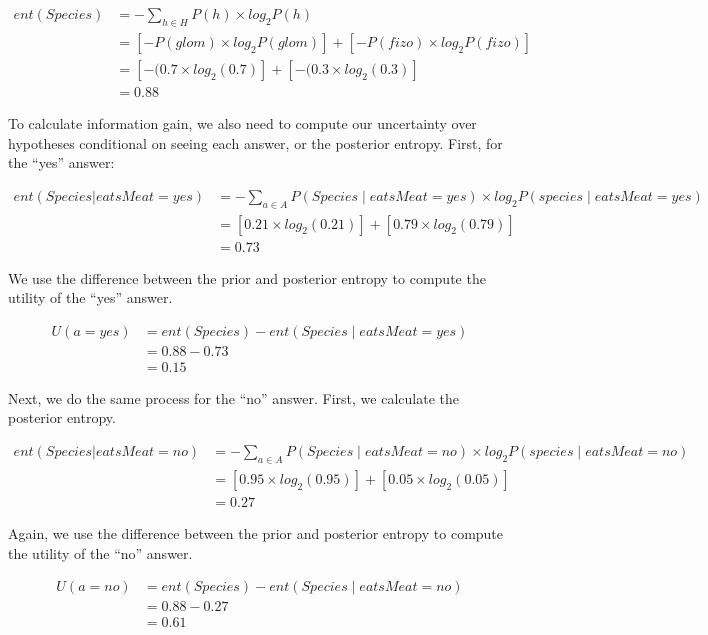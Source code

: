 \documentclass[oneside]{report}
\begin{document}
\[
\begin{aligned}
ent(Species) &= -\sum_{h\in H}{P(h) \times log_2P(h)} \\
 &= [-P(glom) \times log_2P(glom)]+[-P(fizo) \times log_2P(fizo)]\\
 &= [-(0.7 \times log_2(0.7)] + [-(0.3 \times log_2(0.3)]\\
 &= 0.88
\end{aligned}
\]

\noindent
To calculate information gain, we also need to compute our uncertainty
over hypotheses conditional on seeing each answer, or the posterior
entropy. First, for the ``yes'' answer:

\[
\begin{aligned}
ent(Species|eatsMeat = yes) &= -\sum_{a\in A}P(Species \mid eatsMeat = yes) \times log_2P(species \mid eatsMeat = yes) \\
&= [0.21 \times log_2(0.21)] + [0.79 \times log_2(0.79)]\\
&=  0.73
\end{aligned}
\]

\noindent
We use the difference between the prior and posterior entropy to compute
the utility of the ``yes'' answer.

\[
\begin{aligned}
U(a = yes) &= ent(Species) - ent(Species \mid eatsMeat = yes)\\
&= 0.88 - 0.73 \\
&= 0.15
\end{aligned}
\]

\noindent
Next, we do the same process for the ``no'' answer. First, we calculate
the posterior entropy.

\[ 
\begin{aligned}
ent(Species|eatsMeat = no) &= -\sum_{a\in A}{P(Species \mid eatsMeat = no) \times log_2P(species \mid eatsMeat = no)}\\
&= [0.95 \times log_2(0.95)] + [0.05 \times log_2(0.05)]\\
&=  0.27
\end{aligned}
\]

\noindent
Again, we use the difference between the prior and posterior entropy to
compute the utility of the ``no'' answer.

\[ 
\begin{aligned}
U(a = no) &= ent(Species) - ent(Species \mid eatsMeat = no)\\
&= 0.88 - 0.27 \\
&= 0.61
\end{aligned}
\]
\end{document}
